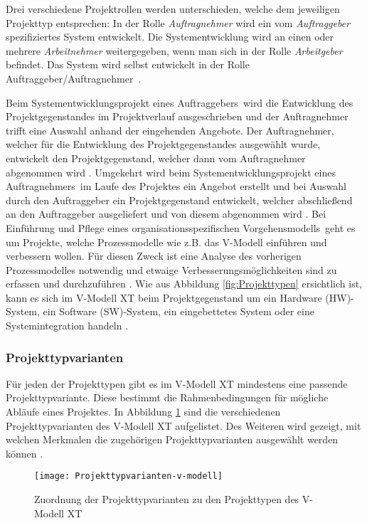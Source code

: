 Drei verschiedene Projektrollen werden unterschieden, welche dem jeweiligen Projekttyp entsprechen: In der Rolle \textit{Auftragnehmer} wird ein vom \textit{Auftraggeber} spezifiziertes System entwickelt. Die Systementwicklung wird an einen oder mehrere \textit{Arbeitnehmer} weitergegeben, wenn man sich in der Rolle \textit{Arbeitgeber} befindet. Das System  wird selbst entwickelt in der Rolle \grqq Auftraggeber/Auftragnehmer\grqq \ \cite{brack2010,2004vmodell}.\newline


Beim \grqq Systementwicklungsprojekt eines Auftraggebers\grqq \ wird die Entwicklung des Projektgegenstandes im Projektverlauf  ausgeschrieben und der Auftragnehmer trifft eine Auswahl anhand der eingehenden Angebote. Der Auftragnehmer, welcher für die Entwicklung des Projektgegenstandes ausgewählt wurde, entwickelt den Projektgegenstand, welcher dann vom Auftragnehmer abgenommen wird \cite{reinhard2008,2004vmodell}.\newline
Umgekehrt wird beim \grqq Systementwicklungsprojekt eines Auftragnehmers\grqq \ im Laufe des Projektes ein Angebot erstellt und bei Auswahl durch den Auftraggeber ein Projektgegenstand entwickelt, welcher abschließend an den Auftraggeber ausgeliefert und von diesem abgenommen wird \cite{reinhard2008,2004vmodell}.\newline
Bei \grqq Einführung und Pflege eines organisationsspezifischen Vorgehensmodells\grqq \ geht es um Projekte, welche Prozessmodelle wie z.B. das V-Modell einführen und verbessern wollen. Für diesen Zweck ist eine Analyse des vorherigen Prozessmodelles notwendig und etwaige Verbesserungsmöglichkeiten sind zu erfassen und durchzuführen \cite{reinhard2008,2004vmodell}.\newline
Wie aus Abbildung \ref{fig:Projekttypen} ersichtlich ist, kann es sich im V-Modell XT beim Projektgegenstand um ein Hardware (HW)-System, ein Software (SW)-System, ein eingebettetes System oder eine Systemintegration handeln \cite{brack2010,2004vmodell}. \newline

\subsubsection{Projekttypvarianten}
Für jeden der Projekttypen gibt es im V-Modell XT mindestens eine passende Projekttypvariante. Diese bestimmt die Rahmenbedingungen für mögliche Abläufe eines Projektes. In Abbildung \ref{fig:Projekttypvarianten} sind die verschiedenen Projekttypvarianten des V-Modell XT aufgelistet. Des Weiteren wird gezeigt, mit welchen Merkmalen die zugehörigen Projekttypvarianten ausgewählt werden können \cite{2004vmodell}.   
\begin{figure}[htp]
\begin{center}
  \texttt{[image: Projekttypvarianten-v-modell]} %
  \caption{Zuordnung der Projekttypvarianten zu den Projekttypen des V-Modell XT \cite{2004vmodell}}
  \label{fig:Projekttypvarianten}
\end{center}
\end{figure}

